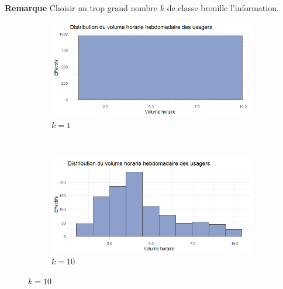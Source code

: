 \documentclass[aspectratio=169,xcolor=dvipsnames]{beamer}
\begin{document}
\begin{frame}

	\begin{exampleblock}{\textbf{Remarque}}
{\footnotesize 	Choisir un trop grand nombre $k$ de classe \og brouille \fg{} l'information.}
		\begin{figure}
		\centering
			\begin{subfigure}{0.4\textwidth}
			\includegraphics[width=\textwidth]{histo_gym_rk1.png}
			\caption{{\tiny $k=1$}}
			\end{subfigure}~
			\begin{subfigure}{0.4\textwidth}
			\includegraphics[width=\textwidth]{histo_gym_rk2.png}
			\caption{{\tiny $k=10$}}			
			\end{subfigure}
			

\end{figure}
\end{exampleblock}
\end{frame}
\end{document}
